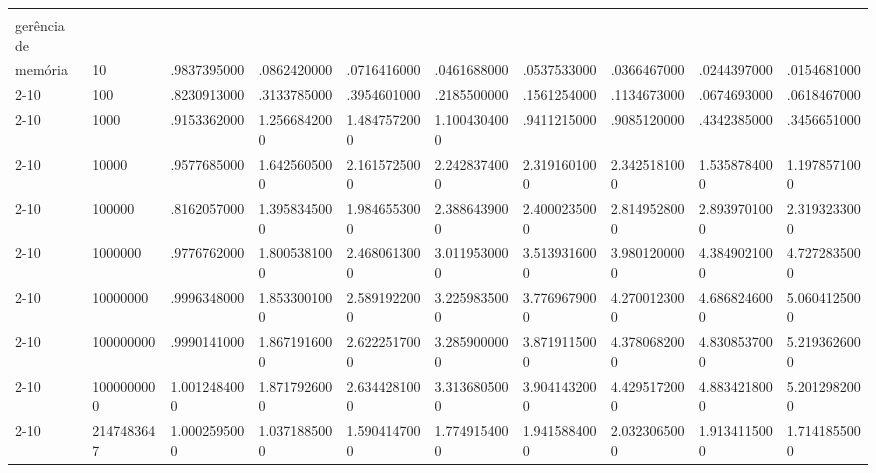 \begin{flushleft}
{\begin{tabular}{|p{1.5cm}|p{1.2cm}|p{1.3cm}|p{1.3cm}|p{1.3cm}|p{1.3cm}|p{1.3cm}|p{1.3cm}|p{1.3cm}|p{1.3cm}|}
\rule{0pt}{4ex}\multirow{9}{*}{\shortstack[l]{\textit{Speedup} sem\\gerência de \\memória}} 
& 10 						& 	.9837395000 		& .0862420000 		& .0716416000 		& .0461688000 		& .0537533000 		& .0366467000 		& .0244397000 		& .0154681000					\\\cline{2-10}
&100 						&  .8230913000 		& .3133785000 		& .3954601000 		& .2185500000 		& .1561254000 		& .1134673000 		& .0674693000 		& .0618467000				\\\cline{2-10}
&1000 					& 	.9153362000 		& 1.2566842000 	& 1.4847572000 	& 1.1004304000 	& .9411215000 		& .9085120000 		& .4342385000 		& .3456651000				\\\cline{2-10}
&10000 				& 	.9577685000 		& 1.6425605000 	& 2.1615725000 	& 2.2428374000 	& 2.3191601000 	& 2.3425181000 	& 1.5358784000 	& 1.1978571000				\\\cline{2-10}
&100000 				& 	.8162057000 		& 1.3958345000 	& 1.9846553000 	& 2.3886439000 	& 2.4000235000 	& 2.8149528000 	& 2.8939701000 	& 2.3193233000					\\\cline{2-10}
&1000000			& 	.9776762000 		& 1.8005381000 	& 2.4680613000 	& 3.0119530000 	& 3.5139316000 	& 3.9801200000 	& 4.3849021000 	& 4.7272835000					\\\cline{2-10}
&10000000 		& 	.9996348000 		& 1.8533001000 	& 2.5891922000 	& 3.2259835000 	& 3.7769679000 	& 4.2700123000 	& 4.6868246000 	& 5.0604125000				\\\cline{2-10}
&100000000 		& 		.9990141000 	& 1.8671916000 	& 2.6222517000 	& 3.2859000000 	& 3.8719115000 	& 4.3780682000 	& 4.8308537000 	& 5.2193626000					\\\cline{2-10}
&1000000000	& 	1.0012484000 	& 1.8717926000 	& 2.6344281000 	& 3.3136805000 	& 3.9041432000 	& 4.4295172000 	& 4.8834218000 	& 5.2012982000				\\\cline{2-10}
&2147483647		& 	1.0002595000 	& 1.0371885000	 	& 1.5904147000 	& 1.7749154000 	& 1.9415884000 	& 2.0323065000 	& 1.9134115000 		& 1.7141855000				\\\hline
\end{tabular}
}
\end{flushleft}


